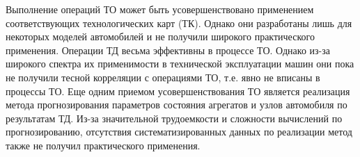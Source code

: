 \documentclass[../nirs.tex]{subfiles}
\begin{document}
Выполнение операций ТО может быть усовершенствовано применением соответствующих
технологических карт (ТК). Однако они разработаны лишь для некоторых моделей
автомобилей и не получили широкого практического применения.
Операции ТД весьма эффективны в процессе ТО. Однако из-за широкого спектра их
применимости в технической эксплуатации машин они пока не получили тесной
корреляции с операциями ТО, т.е. явно не вписаны в процессы ТО. Еще одним
приемом усовершенствования ТО является реализация метода прогнозирования
параметров состояния агрегатов и узлов автомобиля по результатам ТД. Из-за
значительной трудоемкости и сложности вычислений по прогнозированию, отсутствия
систематизированных данных по реализации метод также не получил практического
применения.
\end{document}
